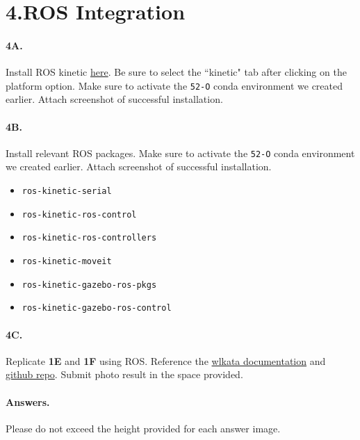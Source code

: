 \newpage
\section*{4.ROS Integration}

\paragraph{4A.} Install ROS kinetic \href{http://wiki.ros.org/Installation}{here}. Be sure to select the ``kinetic" tab after clicking on the platform option.
Make sure to activate the \texttt{52-O} conda environment we created earlier.
Attach screenshot of successful installation.

\paragraph{4B.} Install relevant ROS packages. Make sure to activate the \texttt{52-O} conda environment we created earlier.
Attach screenshot of successful installation.
\begin{itemize}
    \item \texttt{ros-kinetic-serial}
    \item \texttt{ros-kinetic-ros-control }
    \item \texttt{ros-kinetic-ros-controllers }
    \item \texttt{ros-kinetic-moveit }
    \item \texttt{ros-kinetic-gazebo-ros-pkgs }
    \item \texttt{ros-kinetic-gazebo-ros-control}
\end{itemize}

\paragraph{4C.} Replicate \textbf{1E} and \textbf{1F} using ROS. Reference the \href{https://document.wlkata.com/?doc=/wlkata-mirobot-resources-for-education/ros/ }{wlkata documentation} and \href {https://github.com/wlkata/RosForMirobot-master}{github repo}. Submit photo result in the space provided.
 
\newpage
\paragraph{Answers.}
Please do not exceed the height provided for each answer image.

